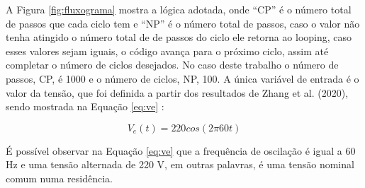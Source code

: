 A Figura \ref{fig:fluxograma} mostra a lógica adotada, onde “CP” é o número total de passos que cada ciclo tem e “NP”  é o número total de passos, caso o valor não tenha atingido o número total de de passos do ciclo ele retorna ao looping, caso esses valores sejam iguais, o código avança para o próximo ciclo, assim até completar o número de ciclos desejados. No caso deste trabalho o número de passos, CP, é 1000 e o número de ciclos, NP, 100.
A única variável de entrada é o valor da tensão, que foi definida a partir dos resultados de Zhang et al. (2020), sendo mostrada na Equação \ref{eq:ve} : 


\begin{equation}\label{eq:ve}
V_e(t)=220cos(2\pi60t)
\end{equation}

\vfill \break


É possível observar na Equação \ref{eq:ve} que a frequência de oscilação é igual a 60 Hz e uma tensão alternada de 220 V, em outras palavras, é uma tensão nominal comum numa residência.




